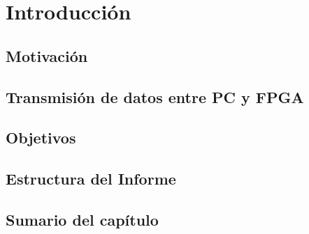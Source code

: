 \chapter{Introducción}
	\label{cap:int}
	
	\section{Motivación}
		\label{int:mot}
		
	\section{Transmisión de datos entre PC y FPGA}
		\label{int:pro}
		
	\section{Objetivos}
		\label{int:obj}
		
	\section{Estructura del Informe}
		\label{int:est}
		
	\section{Sumario del capítulo} 
		\label{int:res}
		
		
%	
%	